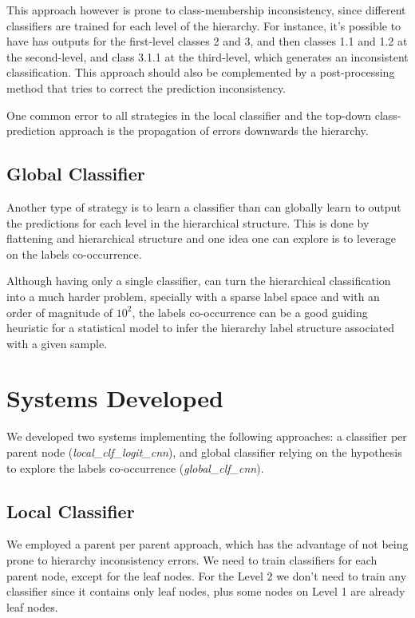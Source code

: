 \documentclass[11pt,a4paper]{article}
\begin{document}
This approach however is prone to class-membership inconsistency, since different classifiers are
trained for each level of the hierarchy. For instance, it's possible to have has outputs for the
first-level classes 2 and 3, and then classes 1.1 and 1.2 at the second-level, and class 3.1.1
at the third-level, which generates an inconsistent classification. This approach should also
be complemented by a post-processing method that tries to correct the prediction inconsistency.

One common error to all strategies in the local classifier and the top-down class-prediction
approach is the propagation of errors downwards the hierarchy.



\subsection{Global Classifier}

Another type of strategy is to learn a classifier than can globally learn to
output the predictions for each level in the hierarchical structure. This is
done by flattening and hierarchical structure and one idea one can explore is to
leverage on the labels co-occurrence.

Although having only a single classifier, can turn the hierarchical classification
into a much harder problem, specially with a sparse label space and with an order
of magnitude of $10^2$, the labels co-occurrence can be a good guiding heuristic
for a statistical model to infer the hierarchy label structure associated with
a given sample.

\section{Systems Developed}\label{system}

We developed two systems implementing the following approaches: a classifier per
parent node (\textit{local\_clf\_logit\_cnn}), and global classifier relying
on the hypothesis to explore the labels co-occurrence (\textit{global\_clf\_cnn}).

\subsection{Local Classifier}

We employed a parent per parent approach, which has the advantage of not being
prone to hierarchy inconsistency errors. We need to train classifiers for each
parent node, except for the leaf nodes. For the Level 2 we don't need to train
any classifier since it contains only leaf nodes, plus some nodes on Level 1
are already leaf nodes.
\end{document}
